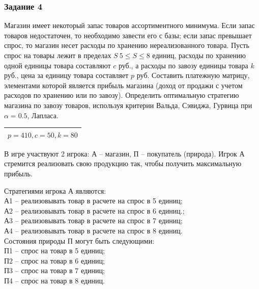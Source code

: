 \documentclass[11pt]{article}
\begin{document}
    \subsubsection*{Задание 4}

Магазин имеет некоторый запас товаров ассортиментного минимума. Если
запас товаров недостаточен, то необходимо завести его с базы; если запас
превышает спрос, то магазин несет расходы по хранению нереализованного
товара. Пусть спрос на товары лежит в пределах \(S \  5 \leq S \leq 8\)
единиц, расходы по хранению одной единицы товара составляют $c$ руб., а
расходы по завозу единицы товара \(k\) руб., цена за единицу товара
составляет \(p\) руб. Составить платежную матрицу, элементами которой
является прибыль магазина (доход от продажи с учетом расходов по
хранению или по завозу). Определить оптимальную стратегию магазина по
завозу товаров, используя критерии Вальда, Сэвиджа, Гурвица при
\(\alpha = 0.5\), Лапласа.
\begin{center}
    \begin{table}[h]
        \centering
        \begin{tabular}{|c|}
            \hline
             $p = 410, c=50, k = 80$ \\
             \hline
        \end{tabular}
    \end{table}
\end{center}

В игре участвуют 2 игрока: А – магазин, П – покупатель (природа).
Игрок А стремится реализовать свою продукцию так, чтобы получить максимальную прибыль. 

Стратегиями игрока А являются:\\
А1 – реализовывать товар в расчете на спрос в 5 единиц;\\
А2 – реализовывать товар в расчете на спрос в 6 единиц.;\\
А3 – реализовывать товар в расчете на спрос в 7 единиц;\\
А4 – реализовывать товар в расчете на спрос в 8 единиц.\\

Состояния природы П могут быть следующими:\\
П1 – спрос на товар в 5 единиц;\\
П2 – спрос на товар в 6 единиц;\\
П3 – спрос на товар в 7 единиц;\\
П4 – спрос на товар в 8 единиц.\\
\end{document}
